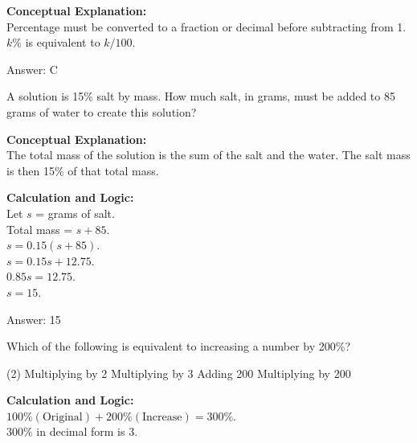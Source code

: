 \documentclass[11pt,paper=a4,answers]{exam}
\begin{document}
\begin{questions}
\begin{solution}
\textbf{Conceptual Explanation:} \\
Percentage must be converted to a fraction or decimal before subtracting from 1. $k\%$ is equivalent to $k/100$.

\vspace{30pt}

Answer: \colorbox{yellow!100}{C}
\end{solution}

\vspace{60pt}

\question
A solution is 15\% salt by mass. How much salt, in grams, must be added to 85 grams of water to create this solution?

\begin{solution}
\textbf{Conceptual Explanation:} \\
The total mass of the solution is the sum of the salt and the water. The salt mass is then 15\% of that total mass.

\vspace{30pt}

\textbf{Calculation and Logic:} \\
Let $s$ = grams of salt. \\
Total mass = $s + 85$. \\
$s = 0.15(s + 85)$. \\
$s = 0.15s + 12.75$. \\
$0.85s = 12.75$. \\
$s = 15$.

\vspace{30pt}

Answer: \colorbox{yellow!100}{15}
\end{solution}

\vspace{60pt}

\question
Which of the following is equivalent to increasing a number by 200\%?
\begin{tasks}(2)
    \task Multiplying by 2
    \task Multiplying by 3
    \task Adding 200
    \task Multiplying by 200
\end{tasks}

\begin{solution}
\textbf{Calculation and Logic:} \\
$100\% (\text{Original}) + 200\% (\text{Increase}) = 300\%$. \\
$300\%$ in decimal form is 3.


\end{solution}
\end{questions}
\end{document}
